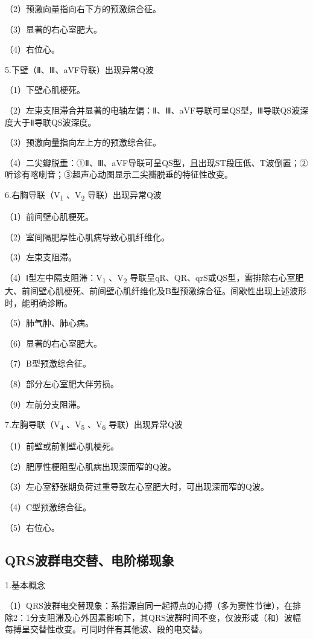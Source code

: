 （2）预激向量指向右下方的预激综合征。

（3）显著的右心室肥大。

（4）右位心。

5.下壁（Ⅱ、Ⅲ、aVF导联）出现异常Q波

（1）下壁心肌梗死。

（2）左束支阻滞合并显著的电轴左偏：Ⅱ、Ⅲ、aVF导联可呈QS型，Ⅲ导联QS波深度大于Ⅱ导联QS波深度。

（3）预激向量指向左上方的预激综合征。

（4）二尖瓣脱垂：①Ⅱ、Ⅲ、aVF导联可呈QS型，且出现ST段压低、T波倒置；②听诊有喀喇音；③超声心动图显示二尖瓣脱垂的特征性改变。

6.右胸导联（V\textsubscript{1} 、V\textsubscript{2} 导联）出现异常Q波

（1）前间壁心肌梗死。

（2）室间隔肥厚性心肌病导致心肌纤维化。

（3）左束支阻滞。

（4）Ⅰ型左中隔支阻滞：V\textsubscript{1} 、V\textsubscript{2}
导联呈qR、QR、qrS或QS型，需排除右心室肥大、前间壁心肌梗死、前间壁心肌纤维化及B型预激综合征。间歇性出现上述波形时，能明确诊断。

（5）肺气肿、肺心病。

（6）显著的右心室肥大。

（7）B型预激综合征。

（8）部分左心室肥大伴劳损。

（9）左前分支阻滞。

7.左胸导联（V\textsubscript{4} 、V\textsubscript{5} 、V\textsubscript{6}
导联）出现异常Q波

（1）前壁或前侧壁心肌梗死。

（2）肥厚性梗阻型心肌病出现深而窄的Q波。

（3）左心室舒张期负荷过重导致左心室肥大时，可出现深而窄的Q波。

（4）C型预激综合征。

（5）右位心。

\protect\hypertarget{text00009.htmlux5cux23subid46}{}{}

\subsection{QRS波群电交替、电阶梯现象}

1.基本概念

（1）QRS波群电交替现象：系指源自同一起搏点的心搏（多为窦性节律），在排除2：1分支阻滞及心外因素影响下，其QRS波群时间不变，仅波形或（和）波幅每搏呈交替性改变。可同时伴有其他波、段的电交替。

